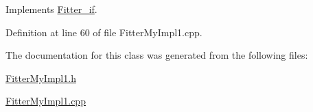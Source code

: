 Implements \hyperlink{class_fitter__if_aa2d2f13548a09a2f727a4190a6b9c2dd}{Fitter\-\_\-if}.



Definition at line 60 of file Fitter\-My\-Impl1.\-cpp.



The documentation for this class was generated from the following files\-:\begin{DoxyCompactItemize}
\item 
\hyperlink{_fitter_my_impl1_8h}{Fitter\-My\-Impl1.\-h}\item 
\hyperlink{_fitter_my_impl1_8cpp}{Fitter\-My\-Impl1.\-cpp}\end{DoxyCompactItemize}
